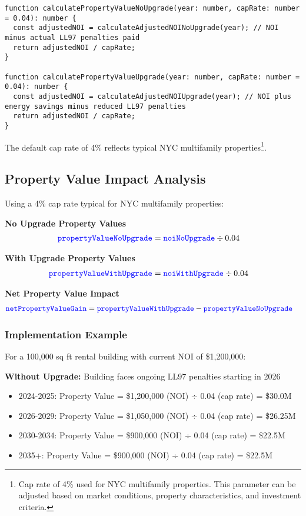 \documentclass{article}
\newcommand{\code}[1]{\textcolor{blue}{\texttt{#1}}}
\begin{document}
\begin{lstlisting}
function calculatePropertyValueNoUpgrade(year: number, capRate: number = 0.04): number {
  const adjustedNOI = calculateAdjustedNOINoUpgrade(year); // NOI minus actual LL97 penalties paid
  return adjustedNOI / capRate;
}

function calculatePropertyValueUpgrade(year: number, capRate: number = 0.04): number {
  const adjustedNOI = calculateAdjustedNOIUpgrade(year); // NOI plus energy savings minus reduced LL97 penalties
  return adjustedNOI / capRate;
}
\end{lstlisting}

The default cap rate of 4\% reflects typical NYC multifamily properties\footnote{Cap rate of 4\% used for NYC multifamily properties. This parameter can be adjusted based on market conditions, property characteristics, and investment criteria.}.

\subsection{Property Value Impact Analysis}

Using a 4\% cap rate typical for NYC multifamily properties:

\textbf{No Upgrade Property Values}
\begin{align}
\code{propertyValueNoUpgrade} &= \code{noiNoUpgrade} \div 0.04
\end{align}

\textbf{With Upgrade Property Values}  
\begin{align}
\code{propertyValueWithUpgrade} &= \code{noiWithUpgrade} \div 0.04
\end{align}

\textbf{Net Property Value Impact}
\begin{align}
\code{netPropertyValueGain} &= \code{propertyValueWithUpgrade} - \code{propertyValueNoUpgrade}
\end{align}

\subsubsection{Implementation Example}

For a 100,000 sq ft rental building with current NOI of \$1,200,000:

\textbf{Without Upgrade:} Building faces ongoing LL97 penalties starting in 2026
\begin{itemize}
    \item 2024-2025: Property Value = \$1,200,000 (NOI) ÷ 0.04 (cap rate) = \$30.0M
    \item 2026-2029: Property Value = \$1,050,000 (NOI) ÷ 0.04 (cap rate) = \$26.25M
    \item 2030-2034: Property Value = \$900,000 (NOI) ÷ 0.04 (cap rate) = \$22.5M
    \item 2035+: Property Value = \$900,000 (NOI) ÷ 0.04 (cap rate) = \$22.5M
\end{itemize}
\end{document}
